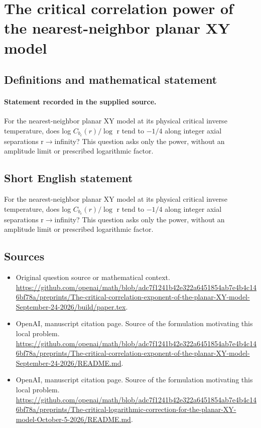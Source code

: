 \documentclass[11pt]{article}
\begin{document}
\section*{The critical correlation power of the nearest-neighbor planar XY model}\label{statement}
\subsection{Definitions and mathematical statement}
\paragraph{Statement recorded in the supplied source.}
For the nearest-neighbor planar XY model at its physical critical inverse temperature, does log $C_{b_c}(r)/\log $ r tend to $-1/4$ along integer axial separations r$\to$infinity? This question asks only the power, without an amplitude limit or prescribed logarithmic factor.
\subsection{Short English statement}
For the nearest-neighbor planar XY model at its physical critical inverse temperature, does log $C_{b_c}(r)/\log $ r tend to $-1/4$ along integer axial separations r$\to$infinity? This question asks only the power, without an amplitude limit or prescribed logarithmic factor.
\subsection{Sources}
\begin{itemize}
\item[S1] Original question source or mathematical context.
\url{https://github.com/openai/math/blob/adc7f1241b42e322a6451854ab7e4b4c146bf78a/preprints/The-critical-correlation-exponent-of-the-planar-XY-model-September-24-2026/build/paper.tex}.
\item[S2] OpenAI, manuscript citation page. Source of the formulation motivating this local problem.
\url{https://github.com/openai/math/blob/adc7f1241b42e322a6451854ab7e4b4c146bf78a/preprints/The-critical-correlation-exponent-of-the-planar-XY-model-September-24-2026/README.md}.
\item[S3] OpenAI, manuscript citation page. Source of the formulation motivating this local problem.
\url{https://github.com/openai/math/blob/adc7f1241b42e322a6451854ab7e4b4c146bf78a/preprints/The-critical-logarithmic-correction-for-the-planar-XY-model-October-5-2026/README.md}.
\end{itemize}
\end{document}
